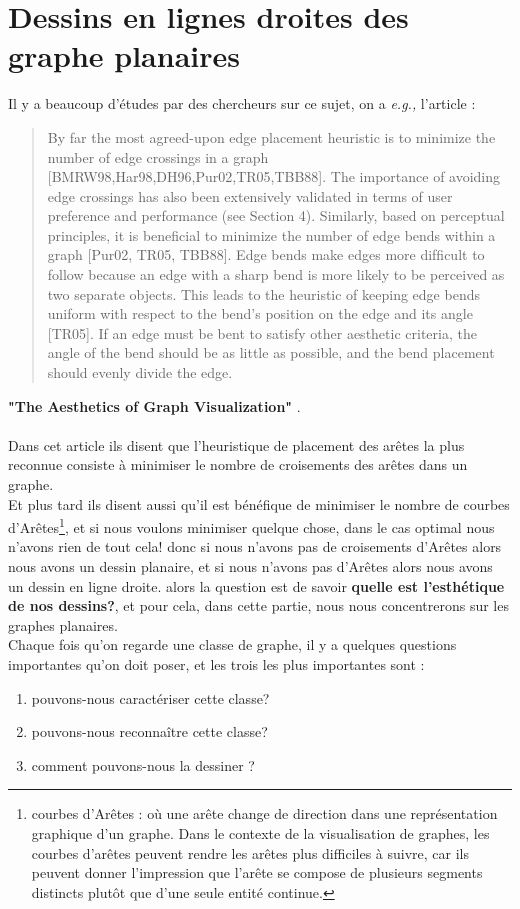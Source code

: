 \documentclass[hidelinks,letterpaper,12pt]{article}
\begin{document}
\section{Dessins en lignes droites des graphe planaires}
\label{Dessins en lignes droites des graphe planaires}
Il y a beaucoup d'études par des chercheurs sur ce sujet, on a \textit{e.g.,} l'article : 
\\
\begin{quote}
By far the most agreed-upon edge placement heuristic is to minimize the number of edge crossings in a graph [BMRW98,Har98,DH96,Pur02,TR05,TBB88]. The importance of avoiding edge crossings has also been extensively	validated in terms of user preference and performance (see Section 4). Similarly, based on perceptual principles, it is beneﬁcial to minimize the number of edge bends within a graph [Pur02, TR05, TBB88]. Edge bends make edges more
difﬁcult to follow because an edge with a sharp bend is more likely to be perceived as two separate objects. This leads to the heuristic of keeping edge bends uniform with respect to
the bend’s position on the edge and its angle [TR05]. If an edge must be bent to satisfy other aesthetic criteria, the angle of the bend should be as little as possible, and the bend
placement should evenly divide the edge.
\end{quote}
\textbf{"The Aesthetics of Graph Visualization"} \citep[3.2, page 8]{BRSG}.
\\ \\
Dans cet article ils disent que l'heuristique de placement des arêtes la plus reconnue consiste à minimiser le nombre de croisements des arêtes dans un graphe. \\
Et plus tard ils disent aussi qu'il est bénéfique de minimiser le nombre de courbes d’Arêtes\footnote{courbes d’Arêtes : où une arête change de direction dans une représentation graphique d'un graphe. Dans le contexte de la visualisation de graphes, les courbes d'arêtes peuvent rendre les arêtes plus difficiles à suivre, car ils peuvent donner l'impression que l'arête se compose de plusieurs segments distincts plutôt que d'une seule entité continue. }, et si nous voulons minimiser quelque chose, dans le cas optimal nous n'avons rien de tout cela! donc si nous n'avons pas de croisements d’Arêtes alors nous avons un dessin planaire, et si nous n'avons pas d’Arêtes alors nous avons un dessin en ligne droite. alors la question est de savoir \textbf{quelle est l'esthétique de nos dessins?}, et pour cela, dans cette partie, nous nous concentrerons sur les graphes planaires.\\
Chaque fois qu'on regarde une classe de graphe, il y a quelques questions importantes qu'on doit poser, et les trois les plus importantes sont :
\begin{enumerate}
\item pouvons-nous caractériser cette classe?
\item pouvons-nous reconnaître cette classe?
\item comment pouvons-nous la dessiner ?
\end{enumerate}
\end{document}
